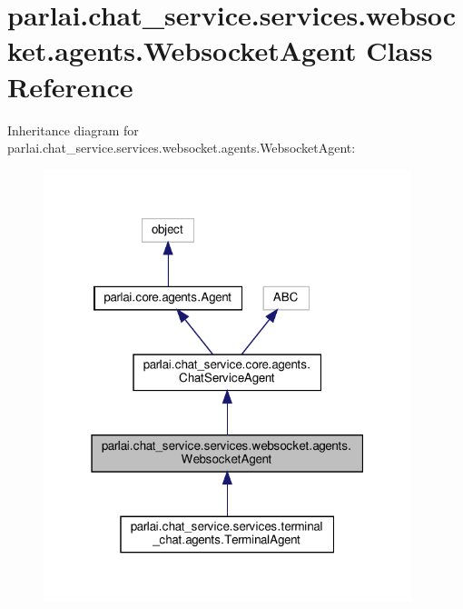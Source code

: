 \hypertarget{classparlai_1_1chat__service_1_1services_1_1websocket_1_1agents_1_1WebsocketAgent}{}\section{parlai.\+chat\+\_\+service.\+services.\+websocket.\+agents.\+Websocket\+Agent Class Reference}
\label{classparlai_1_1chat__service_1_1services_1_1websocket_1_1agents_1_1WebsocketAgent}


Inheritance diagram for parlai.\+chat\+\_\+service.\+services.\+websocket.\+agents.\+Websocket\+Agent\+:
\nopagebreak
\begin{figure}[H]
\begin{center}
\leavevmode
\includegraphics[width=304pt]{d0/d86/classparlai_1_1chat__service_1_1services_1_1websocket_1_1agents_1_1WebsocketAgent__inherit__graph}
\end{center}
\end{figure}



